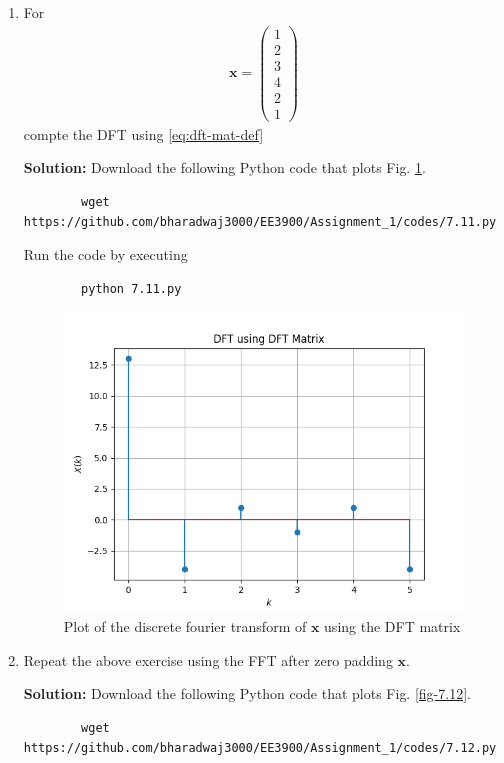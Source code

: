 \documentclass[journal,12pt,twocolumn]{IEEEtran}
\newcommand{\solution}{\noindent \textbf{Solution: }}
\let\vec\mathbf
\numberwithin{equation}{section}
\renewcommand\thesection{\arabic{section}}
\newcommand{\myvec}[1]{\ensuremath{\begin{pmatrix}#1\end{pmatrix}}}
\begin{document}
\begin{enumerate}[label=\thesection.\arabic*]
\item For 
    \begin{align}
	    \vec{x} = \myvec{1\\2\\3\\4\\2\\1}
        \label{eq:equation1}
    \end{align}
    compte the DFT  
		using 
	    \eqref{eq:dft-mat-def}
	    
	\solution Download the following Python code that plots Fig. \ref{fig-7.11}.
	\begin{lstlisting}
		wget https://github.com/bharadwaj3000/EE3900/Assignment_1/codes/7.11.py
	\end{lstlisting}
	
	Run the code by executing
	\begin{lstlisting}
		python 7.11.py
	\end{lstlisting}

	\begin{figure}[!ht]
		\centering
		\includegraphics[width=\columnwidth]{./figs/7.11.png}
		\caption{Plot of the discrete fourier transform of $\vec{x}$ using the DFT matrix}
		\label{fig-7.11}	
	\end{figure}
	
	
    \item Repeat the above exercise using the FFT
	    after zero padding $\vec{x}$.

	\solution Download the following Python code that plots Fig. \ref{fig-7.12}.
	\begin{lstlisting}
		wget https://github.com/bharadwaj3000/EE3900/Assignment_1/codes/7.12.py
	\end{lstlisting}
	

\end{enumerate}
\end{document}
